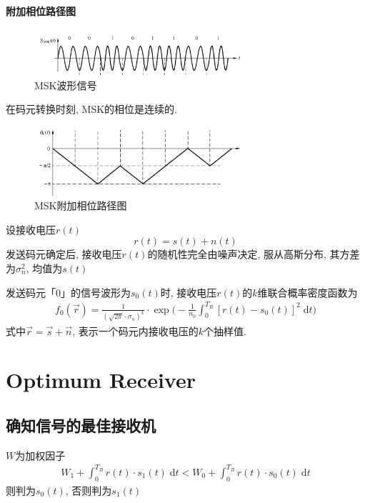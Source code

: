 \documentclass[a4paper]{report}
\begin{document}
\subsubsection{附加相位路径图}
\begin{figure}[H]
\centering
\includegraphics[width=0.7\textwidth]{msk_wave.png}
\caption{MSK波形信号}
\end{figure}
在码元转换时刻, MSK的相位是连续的. 
\begin{figure}[H]
\centering
\includegraphics[width=0.7\textwidth]{msk_phase.png}
\caption{MSK附加相位路径图}
\end{figure}


设接收电压$r(t)$
\begin{equation}
  r(t)=s(t)+n(t)
\end{equation}
发送码元确定后, 接收电压$r(t)$的随机性完全由噪声决定, 服从高斯分布, 其方差为$\sigma_n^2$, 均值为$s(t)$

发送码元「0」的信号波形为$s_0(t)$时, 接收电压$r(t)$的$k$维联合概率密度函数为
\begin{align*}
  f_0(\vec{r})=\frac{1}{(\sqrt{2\pi}\cdot \sigma_n)^k}\cdot \exp \Bigg( - \frac{1}{n_0}\int_0^{T_B} [r(t)-s_0(t)]^2 \;\text{d}t \Bigg)
\end{align*}
式中$\vec{r}=\vec{s}+\vec{n}$, 表示一个码元内接收电压的$k$个抽样值. 

\chapter{Optimum Receiver}
\section{确知信号的最佳接收机}
$W$为加权因子
\begin{align}
  W_1+\int_0^{T_B} r(t)\cdot s_1(t) \; \text{d}t<
  W_0+\int_0^{T_B} r(t)\cdot s_0(t) \; \text{d}t
\end{align}
则判为$s_0(t)$, 否则判为$s_1(t)$
\end{document}
